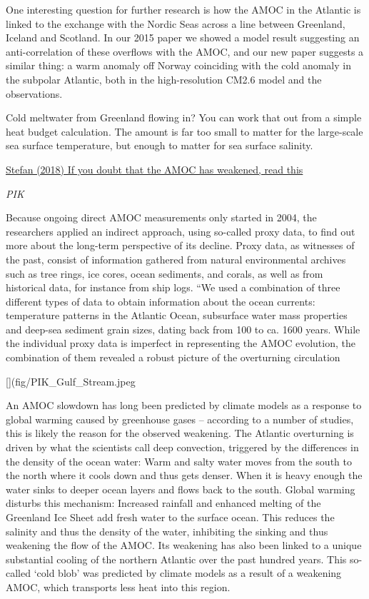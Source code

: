 \documentclass[
]{book}
\begin{document}
One interesting question for further research is how the AMOC in the Atlantic is linked to the exchange with the Nordic Seas across a line between Greenland, Iceland and Scotland. In our 2015 paper we showed a model result suggesting an anti-correlation of these overflows with the AMOC, and our new paper suggests a similar thing: a warm anomaly off Norway coinciding with the cold anomaly in the subpolar Atlantic, both in the high-resolution CM2.6 model and the observations.

Cold meltwater from Greenland flowing in? You can work that out from a simple heat budget calculation. The amount is far too small to matter for the large-scale sea surface temperature, but enough to matter for sea surface salinity.

\href{https://www.realclimate.org/index.php/archives/2018/05/if-you-doubt-that-the-amoc-has-weakened-read-this/}{Stefan (2018) If you doubt that the AMOC has weakened, read this}

\emph{PIK}

Because ongoing direct AMOC measurements only started in 2004, the researchers applied an indirect approach, using so-called proxy data, to find out more about the long-term perspective of its decline. Proxy data, as witnesses of the past, consist of information gathered from natural environmental archives such as tree rings, ice cores, ocean sediments, and corals, as well as from historical data, for instance from ship logs.
``We used a combination of three different types of data to obtain information about the ocean currents: temperature patterns in the Atlantic Ocean, subsurface water mass properties and deep-sea sediment grain sizes, dating back from 100 to ca. 1600 years. While the individual proxy data is imperfect in representing the AMOC evolution, the combination of them revealed a robust picture of the overturning circulation

{[}{]}(fig/PIK\_Gulf\_Stream.jpeg

An AMOC slowdown has long been predicted by climate models as a response to global warming caused by greenhouse gases -- according to a number of studies, this is likely the reason for the observed weakening. The Atlantic overturning is driven by what the scientists call deep convection, triggered by the differences in the density of the ocean water: Warm and salty water moves from the south to the north where it cools down and thus gets denser. When it is heavy enough the water sinks to deeper ocean layers and flows back to the south. Global warming disturbs this mechanism: Increased rainfall and enhanced melting of the Greenland Ice Sheet add fresh water to the surface ocean. This reduces the salinity and thus the density of the water, inhibiting the sinking and thus weakening the flow of the AMOC.
Its weakening has also been linked to a unique substantial cooling of the northern Atlantic over the past hundred years. This so-called `cold blob' was predicted by climate models as a result of a weakening AMOC, which transports less heat into this region.
\end{document}
